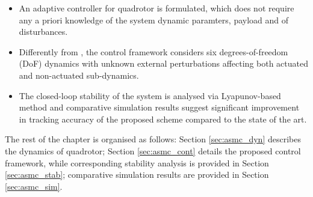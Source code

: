 \begin{itemize}
    \item An adaptive controller for quadrotor is formulated, which does not require any a priori knowledge of the system dynamic paramters, payload and of disturbances. 
    \item Differently from \cite{nicol2011robust, bialy2013lyapunov, dydek2012adaptive, ha2014passivity, mofid2018adaptive}, the control framework considers six degrees-of-freedom (DoF) dynamics with unknown external perturbations affecting both actuated and non-actuated sub-dynamics.
    \item The closed-loop stability of the system is analysed via Lyapunov-based method and comparative simulation results suggest significant improvement in tracking accuracy of the proposed scheme compared to the state of the art.
\end{itemize}

The rest of the chapter is organised as follows: Section \ref{sec:asmc_dyn} describes the dynamics of quadrotor; Section \ref{sec:asmc_cont} details the proposed control framework, while corresponding stability analysis is provided in Section \ref{sec:asmc_stab}; comparative simulation results are provided in Section \ref{sec:asmc_sim}.



